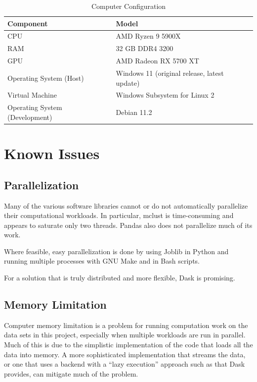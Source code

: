 \begin{theappendices}
\begin{table}
\centering
\begin{tabular}{ll}
\toprule
                     Component &                                        Model \\
\midrule
                           CPU &                            AMD Ryzen 9 5900X \\
                           RAM &                              32 GB DDR4 3200 \\
                           GPU &                        AMD Radeon RX 5700 XT \\
       Operating System (Host) & Windows 11 (original release, latest update) \\
               Virtual Machine &                Windows Subsystem for Linux 2 \\
Operating System (Development) &                                  Debian 11.2 \\
\bottomrule
\end{tabular}
\caption{Computer Configuration}
\label{table:Computer Configuration}
\end{table}

\section{Known Issues}

\subsection{Parallelization}

Many of the various software libraries cannot or do not automatically parallelize their computational workloads. In particular, mclust is time-consuming and appears to saturate only two threads. Pandas also does not parallelize much of its work.

Where feasible, easy parallelization is done by using Joblib in Python and running multiple processes with GNU Make and in Bash scripts.

For a solution that is truly distributed and more flexible, Dask is promising.

\subsection{Memory Limitation}

Computer memory limitation is a problem for running computation work on the data sets in this project, especially when multiple workloads are run in parallel. Much of this is due to the simplistic implementation of the code that loads all the data into memory. A more sophisticated implementation that streams the data, or one that uses a backend with a ``lazy execution'' approach such as that Dask provides, can mitigate much of the problem.


\end{theappendices}